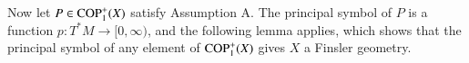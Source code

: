 %
%
% 
%
%
%
%
%
%
%



Now let $P \in {\text{COP}^{+}_{{1}}}(X)$ satisfy Assumption A. The principal symbol of $P$ is a function $p: T^* M \to [0,\infty)$, and the following lemma applies, which shows that the principal symbol of any element of ${\text{COP}^{+}_{{1}}}(X)$ gives $X$ a Finsler geometry.

